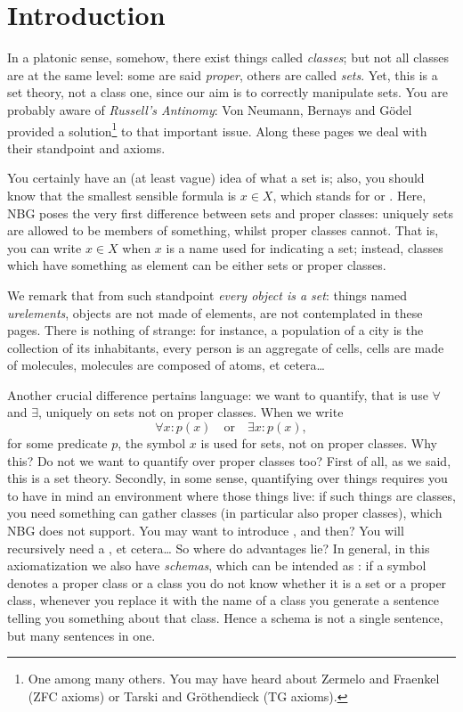 
\section{Introduction}

In a platonic sense, somehow, there exist things called {\em classes}; but not all classes are at the same level: some are said {\em proper}, others are called {\em sets}. Yet, this is a set theory, not a class one, since our aim is to correctly manipulate sets. You are probably aware of {\em Russell's Antinomy}: Von Neumann, Bernays and G\"odel provided a solution\footnote{One among many others. You may have heard about Zermelo and Fraenkel (ZFC axioms) or Tarski and Gr\"othendieck (TG axioms).} to that important issue. Along these pages we deal with their standpoint and axioms.

You certainly have an (at least vague) idea of what a set is; also, you should know that the smallest sensible formula is \(x \in X\), which stands for  or . Here, NBG poses the very first difference between sets and proper classes: uniquely sets are allowed to be members of something, whilst proper classes cannot. That is, you can write \(x \in X\) when \(x\) is a name used for indicating a set; instead, classes which have something as element can be either sets or proper classes.

We remark that from such standpoint {\em every object is a set}: things named {\em urelements}, objects are not made of elements, are not contemplated in these pages. There is nothing of strange: for instance, a population of a city is the collection of its inhabitants, every person is an aggregate of cells, cells are made of molecules, molecules are composed of atoms, et cetera\dots{}

Another crucial difference pertains language: we want to quantify, that is use \(\forall\) and \(\exists\), uniquely on sets not on proper classes. When we write
\[\forall x : p(x) \quad\text{or}\quad \exists x : p(x),\]
for some predicate \(p\), the symbol \(x\) is used for sets, not on proper  classes. Why this? Do not we want to quantify over proper classes too? First of all, as we said, this is a set theory. Secondly, in some sense, quantifying over things requires you to have in mind an environment where those things live: if such things are classes, you need something can gather classes (in particular also proper classes), which NBG does not support. You may want to introduce , and then? You will recursively need a , et cetera\dots{} So where do advantages lie? In general, in this axiomatization we also have {\em schemas}, which can be intended as : if a symbol denotes a proper class or a class you do not know whether it is a set or a proper class, whenever you replace it with the name of a class you generate a sentence telling you something about that class. Hence a schema is not a single sentence, but many sentences in one.

